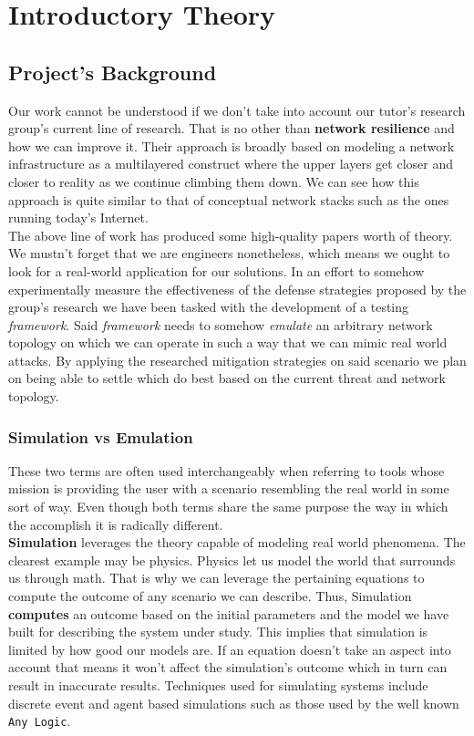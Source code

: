 \chapter{Introductory Theory}
    \section{Project's Background}
        Our work cannot be understood if we don't take into account our tutor's research group's current line of research. That is no other than \textbf{network resilience} and how we can improve it. Their approach is broadly based on modeling a network infrastructure as a multilayered construct where the upper layers get closer and closer to reality as we continue climbing them down. We can see how this approach is quite similar to that of conceptual network stacks such as the ones running today's Internet.\\

        The above line of work has produced some high-quality papers worth of theory. We mustn't forget that we are engineers nonetheless, which means we ought to look for a real-world application for our solutions. In an effort to somehow experimentally measure the effectiveness of the defense strategies proposed by the group's research we have been tasked with the development of a testing \textit{framework}. Said \textit{framework} needs to somehow \textit{emulate} an arbitrary network topology on which we can operate in such a way that we can mimic real world attacks. By applying the researched mitigation strategies on said scenario we plan on being able to settle which do best based on the current threat and network topology.\\

        \subsection{Simulation vs Emulation}
            These two terms are often used interchangeably when referring to tools whose mission is providing the user with a scenario resembling the real world in some sort of way. Even though both terms share the same purpose the way in which the accomplish it is radically different.\\

            \textbf{Simulation} leverages the theory capable of modeling real world phenomena. The clearest example may be physics. Physics let us model the world that surrounds us through math. That is why we can leverage the pertaining equations to compute the outcome of any scenario we can describe. Thus, Simulation \textbf{computes} an outcome based on the initial parameters and the model we have built for describing the system under study. This implies that simulation is limited by how good our models are. If an equation doesn't take an aspect into account that means it won't affect the simulation's outcome which in turn can result in inaccurate results. Techniques used for simulating systems include discrete event and agent based simulations such as those used by the well known \texttt{Any Logic}.\\

